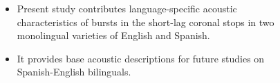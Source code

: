 \documentclass[a0paper,portrait,columns=2]{baposter}
\begin{document}
\begin{poster}
{\begin{itemize}
	\item Present study contributes language-specific acoustic \\ characteristics of bursts in the short-lag coronal 
	stops in two \\ monolingual varieties of English and Spanish. 
	\item It provides base acoustic descriptions for future studies on \\ Spanish-English bilinguals.
\end{itemize}

\vspace{.1in}
}











\end{poster}
\end{document}
